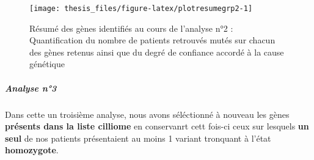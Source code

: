 \documentclass[12pt,twoside]{reedthesis}
\theoremstyle{definition}
\theoremstyle{definition}
\theoremstyle{remark}
\begin{document}
  \begin{figure}
  
  {\centering \texttt{[image: thesis\_files/figure-latex/plotresumegrp2-1]} 
  
  }
  
  \caption[Résumé des gènes identifiés au cours de l'analyse n°2]{Résumé des gènes identifiés au cours de l'analyse n°2 : Quantification du nombre de patients retrouvés mutés sur chacun des gènes retenus ainsi que du degré de confiance accordé à la cause génétique}\label{fig:plotresumegrp2}
  \end{figure}
  
  \newpage
  
  \subparagraph{Analyse n°3}\label{analyse-n3}
  
  Dans cette un troisième analyse, nous avons séléctionné à nouveau les
  gènes \textbf{présents dans la liste cilliome} en conservanrt cett
  fois-ci ceux sur lesquels \textbf{un seul} de nos patients présentaient
  au moins 1 variant tronquant à l'état \textbf{homozygote}.
  
\end{document}
